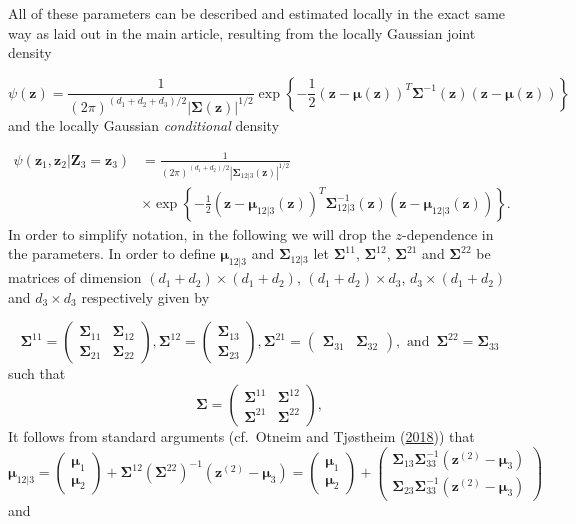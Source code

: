 \documentclass[
  12pt,
  letterpaper]{article}
\numberwithin{equation}{section}
\newcommand{\Z}{\bm{Z}}
\newcommand{\z}{\bm{z}}
\newcommand{\ztwo}{\bm{z}^{(2)}}
\newcommand{\fmu}{\bm{\mu}}
\newcommand{\fSigma}{\bm{\Sigma}}
\begin{document}
All of these parameters can be described and estimated locally in the exact same way as laid out in the main article, resulting from the locally Gaussian joint density

\begin{equation}
\psi(\z) = \frac{1}{(2\pi)^{(d_1+d_2+d_3)/2}|\fSigma(\z)|^{1/2}} \exp \left\{-\frac{1}{2}(\z - \fmu(\z))^T\fSigma^{-1}(\z)(\z - \fmu(\z))\right\}
\label{eq:localgaussian0}
\end{equation}
and the locally Gaussian \emph{conditional} density

\begin{align*}
\psi(\z_1, \z_2 | \Z_3 = \z_3) & = \frac{1}{(2\pi)^{(d_1+d_2)/2}|\fSigma_{12|3}(\z)|^{1/2}} \nonumber  \\ 
\qquad\qquad\qquad & \times \exp \left\{-\frac{1}{2}(\z - \fmu_{12|3}(\z))^T\fSigma_{12|3}^{-1}(\z)(\z - \fmu_{12|3}(\z))\right\}.
\end{align*}
In order to simplify notation, in the following we will drop the \(z\)-dependence in the parameters. In order to define \(\fmu_{12|3}\) and \(\fSigma_{12|3}\) let \(\fSigma^{11}\), \(\fSigma^{12}\), \(\fSigma^{21}\) and \(\fSigma^{22}\) be matrices of dimension \((d_1 + d_2) \times (d_1 + d_2)\), \((d_1 + d_2) \times d_3\), \(d_3 \times (d_1 + d_2)\) and \(d_3 \times d_3\) respectively given by

\[\fSigma^{11} = \begin{pmatrix} \fSigma_{11} & \fSigma_{12} \\ \fSigma_{21} & \fSigma_{22}\end{pmatrix}, \fSigma^{12} = \begin{pmatrix} \fSigma_{13} \\ \fSigma_{23}\end{pmatrix}, \fSigma^{21} = \begin{pmatrix} \fSigma_{31} & \fSigma_{32}\end{pmatrix}, \textrm{ and } \, \fSigma^{22} = \fSigma_{33}\]
such that
\[\fSigma = \begin{pmatrix} \fSigma^{11} & \fSigma^{12} \\ \fSigma^{21} & \fSigma^{22}\end{pmatrix},\]
It follows from standard arguments (cf.~Otneim and Tjøstheim (\protect\hyperlink{ref-otneim2017conditional}{2018})) that
\begin{equation}
\fmu_{12|3} = \begin{pmatrix} \fmu_1 \\ \fmu_2 \end{pmatrix} + \fSigma^{12}\left(\fSigma^{22}\right)^{-1}\left(\ztwo - \fmu_3\right) = \begin{pmatrix} \fmu_1 \\ \fmu_2 \end{pmatrix} + \begin{pmatrix} \fSigma_{13}\fSigma_{33}^{-1} \left(\ztwo - \fmu_3\right) \\  \fSigma_{23}\fSigma_{33}^{-1} \left(\ztwo - \fmu_3\right)\end{pmatrix}
\end{equation}
and
\end{document}
